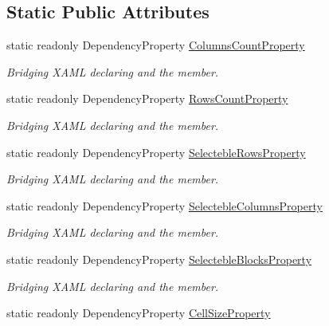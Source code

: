 \subsection*{Static Public Attributes}
\begin{DoxyCompactItemize}
\item 
static readonly Dependency\+Property \mbox{\hyperlink{class_wpf_handler_1_1_u_i_1_1_controls_1_1_selectable_grid_ae01cdb093f79b7c6a66afee98475c64a}{Columns\+Count\+Property}}
\begin{DoxyCompactList}\small\item\em Bridging X\+A\+ML declaring and the member. \end{DoxyCompactList}\item 
static readonly Dependency\+Property \mbox{\hyperlink{class_wpf_handler_1_1_u_i_1_1_controls_1_1_selectable_grid_a3745830392e0dc3a51702709acc6d2f3}{Rows\+Count\+Property}}
\begin{DoxyCompactList}\small\item\em Bridging X\+A\+ML declaring and the member. \end{DoxyCompactList}\item 
static readonly Dependency\+Property \mbox{\hyperlink{class_wpf_handler_1_1_u_i_1_1_controls_1_1_selectable_grid_a12533edc00d4b969496b7099fed1f502}{Selecteble\+Rows\+Property}}
\begin{DoxyCompactList}\small\item\em Bridging X\+A\+ML declaring and the member. \end{DoxyCompactList}\item 
static readonly Dependency\+Property \mbox{\hyperlink{class_wpf_handler_1_1_u_i_1_1_controls_1_1_selectable_grid_aed373719e62f55815d7042d62fdf8a88}{Selecteble\+Columns\+Property}}
\begin{DoxyCompactList}\small\item\em Bridging X\+A\+ML declaring and the member. \end{DoxyCompactList}\item 
static readonly Dependency\+Property \mbox{\hyperlink{class_wpf_handler_1_1_u_i_1_1_controls_1_1_selectable_grid_ad500e6d2835a39f0b2b3d7e617d41c3c}{Selecteble\+Blocks\+Property}}
\begin{DoxyCompactList}\small\item\em Bridging X\+A\+ML declaring and the member. \end{DoxyCompactList}\item 
static readonly Dependency\+Property \mbox{\hyperlink{class_wpf_handler_1_1_u_i_1_1_controls_1_1_selectable_grid_af2a964404379788302d8cc9665bcad24}{Cell\+Size\+Property}}

\end{DoxyCompactItemize}
